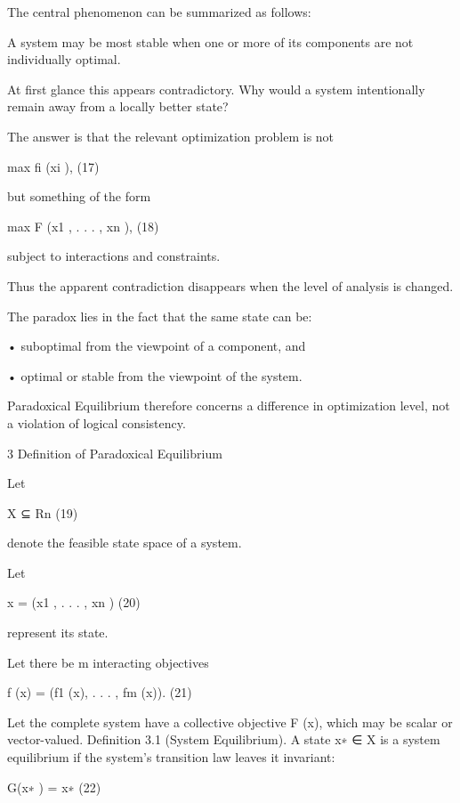 \documentclass[10pt,a4paper]{article}
\begin{document}
\begin{ManuscriptText}
The central phenomenon can be summarized as follows:


      A system may be most stable when one or more of its components are not individually
      optimal.


At first glance this appears contradictory. Why would a system intentionally remain away from
a locally better state?

The answer is that the relevant optimization problem is not


                                            max fi (xi ),                                   (17)


but something of the form


                                          max F (x1 , . . . , xn ),                          (18)

subject to interactions and constraints.

Thus the apparent contradiction disappears when the level of analysis is changed.

The paradox lies in the fact that the same state can be:

    • suboptimal from the viewpoint of a component, and

    • optimal or stable from the viewpoint of the system.

Paradoxical Equilibrium therefore concerns a difference in optimization level, not a violation of
logical consistency.


3     Definition of Paradoxical Equilibrium

Let


                                                 X ⊆ Rn                                      (19)

denote the feasible state space of a system.

Let


                                            x = (x1 , . . . , xn )                           (20)

represent its state.

Let there be m interacting objectives


                                      f (x) = (f1 (x), . . . , fm (x)).                      (21)

Let the complete system have a collective objective F (x), which may be scalar or vector-valued.
Definition 3.1 (System Equilibrium). A state x∗ ∈ X is a system equilibrium if the system’s
transition law leaves it invariant:


                                               G(x∗ ) = x∗                                   (22)


\end{ManuscriptText}
\end{document}
